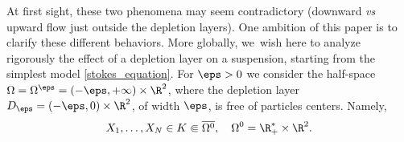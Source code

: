 At first sight, these two phenomena may seem contradictory (downward {\it vs} upward flow just outside the depletion layers). One ambition of this paper is to clarify these different behaviors. More globally, we~wish here to analyze rigorously the effect of a depletion layer on a suspension, starting from the simplest model \eqref{stokes_equation}. For $\eps > 0$ we consider the half-space $\Omega = \Omega^\eps = (-\eps,+\infty) \times \R^2$, where the depletion layer $D_\eps = (-\eps,0) \times \R^2$, of width $\eps$, is free of particles centers. Namely,
\begin{equation} \label{eq_assumption}
X_1, \dots, X_N \in K \Subset \overline{\Omega^0}, \quad \Omega^0 = \R^*_+ \times \R^2.
\end{equation}
